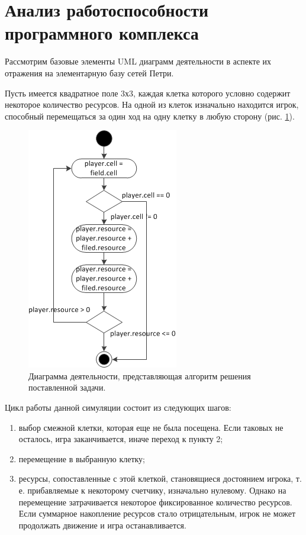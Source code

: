 \section{Анализ работоспособности программного комплекса}

Рассмотрим базовые элементы UML диаграмм деятельности в аспекте их отражения на элементарную базу сетей Петри. 

Пусть имеется квадратное поле 3х3, каждая клетка которого условно содержит некоторое количество ресурсов. На одной из клеток изначально находится игрок, способный перемещаться за один ход на одну клетку в любую сторону (рис. \ref{fig:fig27}).

\begin{figure}
	\begin{center}
		\includegraphics[scale=1]{include/ActivityDiagram.png}
	\end{center}
	\caption{Диаграмма деятельности, представляющая алгоритм решения поставленной задачи.}
	\label{fig:fig27}
\end{figure}

Цикл работы данной симуляции состоит из следующих шагов:
\begin{enumerate}
\item[1.] выбор смежной клетки, которая еще не была посещена. Если таковых не осталось, игра заканчивается, иначе переход к пункту 2;
\item[2.] перемещение в выбранную клетку;
\item[3.] ресурсы, сопоставленные с этой клеткой, становящиеся достоянием игрока, т. е. прибавляемые к некоторому счетчику, изначально нулевому. Однако на перемещение затрачивается некоторое фиксированное количество ресурсов. Если суммарное накопление ресурсов стало отрицательным, игрок не может продолжать движение и игра останавливается.
\end{enumerate}


